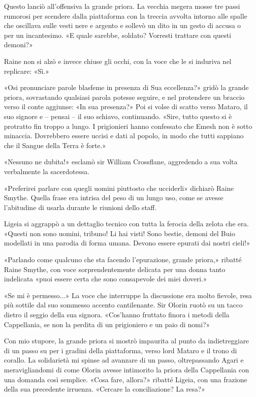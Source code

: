 Questo lanciò all'offensiva la grande priora. La vecchia megera mosse
tre passi rumorosi per scendere dalla piattaforma con la treccia avvolta
intorno alle spalle che oscillava sulle vesti nere e argento e sollevò
un dito in un gesto di accusa o per un incantesimo. «E quale sarebbe,
soldato? Vorresti trattare con questi demoni?»

Raine non si alzò e invece chiuse gli occhi, con la voce che le si
induriva nel replicare: «Sì.»

«Osi pronunciare parole blasfeme in presenza di Sua eccellenza?» gridò
la grande priora, sovrastando qualsiasi parola potesse seguire, e nel
protendere un braccio verso il conte aggiunse: «In sua presenza?» Poi si
volse di scatto verso Mataro, il suo signore e -- pensai -- il suo
schiavo, continuando. «Sire, tutto questo si è protratto fin troppo a
lungo. I prigionieri hanno confessato che Emesh non è sotto minaccia.
Dovrebbero essere uccisi e dati al popolo, in modo che tutti sappiano
che il Sangue della Terra è forte.»

«Nessuno ne dubita!» esclamò sir William Crossflane, aggredendo a sua
volta verbalmente la sacerdotessa.

«Preferirei parlare con quegli uomini piuttosto che ucciderli» dichiarò
Raine Smythe. Quella frase era intrisa del peso di un lungo uso, come se
avesse l'abitudine di usarla durante le riunioni dello staff.

Ligeia si aggrappò a un dettaglio tecnico con tutta la ferocia della
zelota che era. «Questi non sono uomini, tribuno! Li hai visti! Sono
bestie, demoni del Buio modellati in una parodia di forma umana. Devono
essere epurati dai nostri cieli!»

«Parlando come qualcuno che sta facendo l'epurazione, grande priora,»
ribatté Raine Smythe, con voce sorprendentemente delicata per una donna
tanto indelicata «puoi essere certa che sono consapevole dei miei
doveri.»

«Se mi è permesso...» La voce che interruppe la discussione era molto
fievole, resa più sottile dal suo sommesso accento cantilenante. Sir
Olorin ruotò su un tacco dietro il seggio della sua signora. «Cos'hanno
fruttato finora i metodi della Cappellania, se non la perdita di un
prigioniero e un paio di nomi?»

Con mio stupore, la grande priora si mostrò impaurita al punto da
indietreggiare di un passo su per i gradini della piattaforma, verso
lord Mataro e il trono di corallo. La solidarietà mi spinse ad avanzare
di un passo, oltrepassando Agari e meravigliandomi di come Olorin avesse
intimorito la priora della Cappellania con una domanda così semplice.
«Cosa fare, allora?» ribatté Ligeia, con una frazione della sua
precedente irruenza. «Cercare la conciliazione? La resa?»

